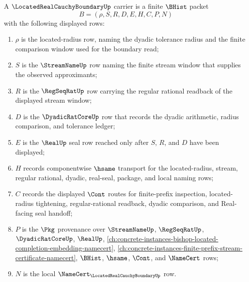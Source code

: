 \begin{definition}
\label{def:located-real-cauchy-boundary-carrier}
A $\LocatedRealCauchyBoundaryUp$ carrier is a finite $\BHist$ packet
$$
B=(\rho,S,R,D,E,H,C,P,N)
$$
with the following displayed rows:
\begin{enumerate}
\item $\rho$ is the located-radius row, naming the dyadic tolerance radius and the finite comparison window used for the boundary read;
\item $S$ is the $\StreamNameUp$ row naming the finite stream window that supplies the observed approximants;
\item $R$ is the $\RegSeqRatUp$ row carrying the regular rational readback of the displayed stream window;
\item $D$ is the $\DyadicRatCoreUp$ row that records the dyadic arithmetic, radius comparison, and tolerance ledger;
\item $E$ is the $\RealUp$ seal row reached only after $S$, $R$, and $D$ have been displayed;
\item $H$ records componentwise $\hsame$ transport for the located-radius, stream, regular rational, dyadic, real-seal, package, and local naming rows;
\item $C$ records the displayed $\Cont$ routes for finite-prefix inspection, located-radius tightening, regular-rational readback, dyadic comparison, and Real-facing seal handoff;
\item $P$ is the $\Pkg$ provenance over $\StreamNameUp$, $\RegSeqRatUp$, $\DyadicRatCoreUp$, $\RealUp$, \autoref{ch:concrete-instances-bishop-located-completion-embedding-namecert}, \autoref{ch:concrete-instances-finite-prefix-stream-certificate-namecert}, $\BHist$, $\hsame$, $\Cont$, and $\NameCert$ rows;
\item $N$ is the local $\NameCert_{\LocatedRealCauchyBoundaryUp}$ row.
\end{enumerate}
\end{definition}

